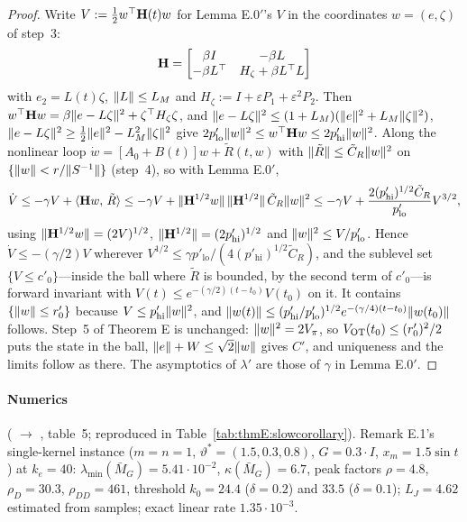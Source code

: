 \begin{proof}
Write $V:=\frac12w^\top\mathbf{H}(t)w$ for Lemma E.0$'$'s $V$ in the coordinates $w=(e,\zeta)$ of step~3:
\[
  \mathbf{H}=\begin{bmatrix}\beta I&-\beta L\\-\beta L^\top&H_\zeta+\beta L^\top L\end{bmatrix}
\]
with $e_2=L(t)\zeta$, $\lVert L\rVert\le L_M$ and $H_\zeta:=I+\varepsilon P_1+\varepsilon^2P_2$. Then
$w^\top\mathbf{H}w=\beta\lVert e-L\zeta\rVert^2+\zeta^\top H_\zeta\zeta$, and
$\lVert e-L\zeta\rVert^2\le(1+L_M)(\lVert e\rVert^2+L_M\lVert \zeta\rVert^2)$,
$\lVert e-L\zeta\rVert^2\ge\frac12\lVert e\rVert^2-L_M^2\lVert \zeta\rVert^2$ give
$2p'_{\mathrm{lo}}\lVert w\rVert^2\le w^\top\mathbf{H}w\le2p'_{\mathrm{hi}}\lVert w\rVert^2$. Along the nonlinear loop
$\dot w=[A_0+B(t)]w+\tilde R(t,w)$ with $\lVert \tilde R\rVert\le\tilde C_R\lVert w\rVert^2$ on $\{\lVert w\rVert<r/\lVert S^{-1}\rVert\}$
(step~4), so with Lemma E.0$'$,
\[
  \dot V\le-\gamma V+\langle \mathbf{H}w,\, \tilde R\rangle
  \le-\gamma V+\lVert \mathbf{H}^{1/2}w\rVert\,\lVert \mathbf{H}^{1/2}\rVert\,\tilde C_R\lVert w\rVert^2
  \le-\gamma V+\frac{2(p'_{\mathrm{hi}})^{1/2}\tilde C_R}{p'_{\mathrm{lo}}}V^{3/2},
\]
using $\lVert \mathbf{H}^{1/2}w\rVert=(2V)^{1/2}$, $\lVert \mathbf{H}^{1/2}\rVert=(2p'_{\mathrm{hi}})^{1/2}$ and
$\lVert w\rVert^2\le V/p'_{\mathrm{lo}}$. Hence $\dot V\le-(\gamma/2)V$ wherever
$V^{1/2}\le\gamma p'_{\mathrm{lo}}/(4(p'_{\mathrm{hi}})^{1/2}\tilde C_R)$, and the sublevel set $\{V\le c'_0\}$---inside
the ball where $\tilde R$ is bounded, by the second term of $c'_0$---is forward invariant with
$V(t)\le e^{-(\gamma/2)(t-t_0)}V(t_0)$ on it. It contains $\{\lVert w\rVert\le r'_0\}$ because $V\le p'_{\mathrm{hi}}\lVert w\rVert^2$,
and $\lVert w(t)\rVert\le(p'_{\mathrm{hi}}/p'_{\mathrm{lo}})^{1/2}e^{-(\gamma/4)(t-t_0)}\lVert w(t_0)\rVert$ follows. Step~5 of
Theorem E is unchanged: $\lVert w\rVert^2=2V_\pi$, so $V_{\mathrm{OT}}(t_0)\le(r'_0)^2/2$ puts the state in the ball,
$\lVert e\rVert+W\le\sqrt2\lVert w\rVert$ gives $C'$, and uniqueness and the limits follow as there. The asymptotics of
$\lambda'$ are those of $\gamma$ in Lemma E.0$'$.
\end{proof}

\paragraph{Numerics} ( $\to$ , table~5; reproduced
in Table~\ref{tab:thmE:slowcorollary}). Remark E.1's single-kernel instance ($m=n=1$, $\vartheta^*=(1.5,0.3,0.8)$,
$G=0.3\cdot I$, $x_m=1.5\sin t$) at $k_e=40$: $\lambda_{\min}(\bar M_G)=5.41\cdot10^{-2}$, $\kappa(\bar M_G)=6.7$,
peak factors $\rho=4.8$, $\rho_D=30.3$, $\rho_{DD}=461$, threshold $k_0=24.4$ ($\delta=0.2$) and $33.5$
($\delta=0.1$); $L_J=4.62$ estimated from samples; exact linear rate $1.35\cdot10^{-3}$.

